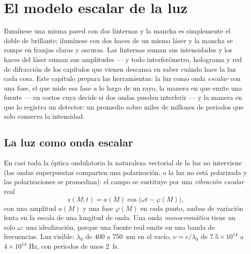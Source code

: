 \chapter{El modelo escalar de la luz}\label{ch:b2:scalar-light-model}

Ilumínese una misma pared con dos linternas y la mancha es simplemente
el doble de brillante; ilumínese con dos haces de un mismo láser y la
mancha se rompe en franjas claras y oscuras. Las linternas suman sus
intensidades y los haces del láser suman sus amplitudes --- y todo
interferómetro, holograma y red de difracción de los capítulos que vienen
descansa en saber cuándo hace la luz cada cosa. Este capítulo prepara las
herramientas: la luz como onda \emph{escalar} con una fase, el
\emph{} que mide esa fase a lo largo de un rayo, la manera en
que emite una fuente --- en  cortos cuya \emph{} decide si dos ondas pueden interferir --- y la manera en que
lo registra un detector: un promedio sobre miles de millones de periodos
que solo conserva la intensidad.

\section{La luz como onda escalar}

\begin{definition}\label{def:b2:scalar-light-model:scalar}
En casi toda la óptica ondulatoria la naturaleza vectorial de la luz no interviene (las
ondas superpuestas comparten una polarización, o la luz no está polarizada
y las polarizaciones se promedian): el campo se sustituye por una
\emph{vibración escalar} real
\[
s(M, t) = a(M)\cos\bigl(\omega t - \varphi(M)\bigr) ,
\]
con una amplitud $a(M)$ y una fase $\varphi(M)$ en cada punto, ambas de
variación lenta en la escala de una longitud de onda. Una onda \emph{monocromática}
tiene un solo $\omega$: una idealización, porque una fuente real emite
en una banda de frecuencias. Luz visible: $\lambda_0$ de $400$ a
\qty{750}{nm} en el vacío, $\nu = c/\lambda_0$ de $7.5 \times 10^{14}$ a $4 \times 10^{14}$ Hz,
con periodos de unos \qty{2}{fs}.
\end{definition}

